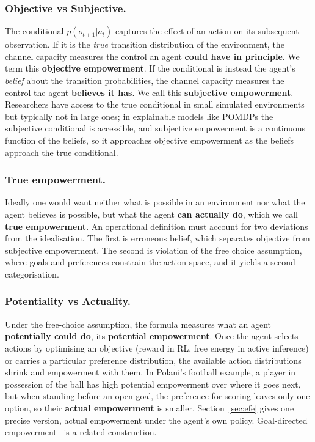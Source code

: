 \documentclass[pdflatex,sn-apa]{sn-jnl}%
\theoremstyle{definition}
\begin{document}
\subsubsection{Objective vs Subjective.} The conditional $p(o_{t+1}|a_t)$ captures the effect of an action on its subsequent observation. If it is the \emph{true} transition distribution of the environment, the channel capacity measures the control an agent \textbf{could have in principle}. We term this \textbf{objective empowerment}. If the conditional is instead the agent's \emph{belief} about the transition probabilities, the channel capacity measures the control the agent \textbf{believes it has}. We call this \textbf{subjective empowerment}. Researchers have access to the true conditional in small simulated environments but typically not in large ones; in explainable models like POMDPs the subjective conditional is accessible, and subjective empowerment is a continuous function of the beliefs, so it approaches objective empowerment as the beliefs approach the true conditional.

\subsubsection{True empowerment.} Ideally one would want neither what is possible in an environment nor what the agent believes is possible, but what the agent \textbf{can actually do}, which we call \textbf{true empowerment}. An operational definition must account for two deviations from the idealisation. The first is erroneous belief, which separates objective from subjective empowerment. The second is violation of the free choice assumption, where goals and preferences constrain the action space, and it yields a second categorisation.

\subsubsection{Potentiality vs Actuality.} Under the free-choice assumption, the formula measures what an agent \textbf{potentially could do}, its \textbf{potential empowerment}. Once the agent selects actions by optimising an objective (reward in RL, free energy in active inference) or carries a particular preference distribution, the available action distributions shrink and empowerment with them. In Polani's football example, a player in possession of the ball has high potential empowerment over where it goes next, but when standing before an open goal, the preference for scoring leaves only one option, so their \textbf{actual empowerment} is smaller. Section~\ref{sec:efe} gives one precise version, actual empowerment under the agent's own policy. Goal-directed empowerment~\citep{goalDirectedEmpowerment} is a related construction.
\end{document}
